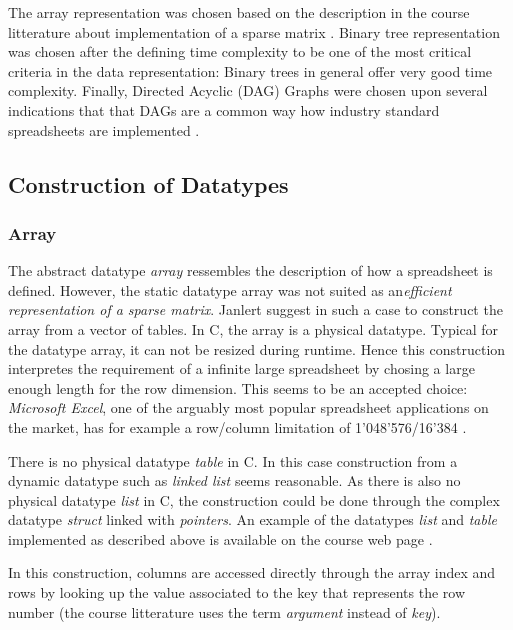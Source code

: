\documentclass[a4paper,11pt,twoside]{article}
\begin{document}
The array representation was chosen based on the description in the 
course litterature about implementation of a sparse matrix
\cite{janlert2000}. Binary tree representation was chosen after the
defining time complexity to be one of the most critical criteria in
the data representation: Binary trees in general offer very good time
complexity. Finally, Directed Acyclic (DAG) Graphs were chosen upon
several indications that that DAGs are a common way how industry
standard spreadsheets are implemented \cite{spreadsheet1}\cite{spreadsheet2}
\cite{spreadsheet3}.


\subsection{Construction of Datatypes}
\subsubsection{Array}
The abstract datatype \emph{array} ressembles the description of 
how a spreadsheet is defined. However, the static datatype array was
not suited as an\emph{efficient representation of a  sparse
 matrix}. Janlert \cite[pp 101-103]{janlert2000} suggest in such a
case to construct the array from a vector of tables. In C, the 
array is a physical datatype. Typical for the datatype array, it can
not be resized during runtime. Hence this construction interpretes the
requirement of a infinite large spreadsheet by chosing a large enough
length for the row dimension. This seems to be an accepted choice:
\textit{Microsoft Excel}, one of the arguably most popular spreadsheet
applications on the market, has for example a row/column limitation of
1'048'576/16'384 \cite{excel_limit}.

There is no physical datatype \textit{table} in C. In this case construction
from a dynamic datatype such as \textit{linked list} seems reasonable. As
there is also no physical datatype \textit{list} in C, the construction could
be done through the complex datatype \textit{struct} linked with
\textit{pointers}. An example of the datatypes \textit{list} and
\textit{table} implemented as described above is available on the course
web page \cite{datatypes}.

In this construction, columns are accessed directly through the array
index and rows by looking up the value associated to the key that
represents the row number (the course litterature uses the term
\textit{argument} instead of \textit{key}\cite{janlert2000}).
 
\end{document}
